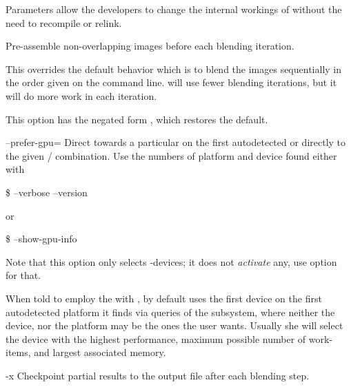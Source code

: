 \begin{codelist}
  Parameters allow the developers to change the internal workings of
  \App{} without the need to recompile or relink.


\ifenblend
  \label{opt:pre-assemble}%
  \item[\itempar{-a \\ --pre-assemble}]\itemend
    Pre-assemble non-overlapping images before each blending
    iteration.

    This overrides the default behavior which is to blend the images
    sequentially in the order given on the command line.  \App{} will
    use fewer blending iterations, but it will do more work in each
    iteration.

    This option has the negated form
    ,
    which restores the default.
\fi


  \label{opt:prefer-gpu}%
\item[--prefer-gpu=\optional{\metavar{PLATFORM}:}\metavar{DEVICE}
  \restrictednote{\acronym{OpenCL}-enabled versions only.}]\itemend
  Direct \App{} towards a particular 
   on the first autodetected
   or directly to the given
  \slash{} combination.  Use the
  numbers of platform and device found either with
  \begin{terminal}
    \$ \app{} --verbose --version
  \end{terminal}
  or
  \begin{terminal}
    \$ \app{} --show-gpu-info
  \end{terminal}
  Note that this option only selects -devices; it does
  not \emph{activate} any, use
  option~ for that.

  When told to employ the  with
  , by default \App{} uses the first device on the first
  autodetected platform it finds via queries of the
   subsystem, where neither the device,
  nor the platform may be the ones the user wants.  Usually she will
  select the device with the highest performance, maximum possible
  number of work-items, and largest associated memory.


\ifenblend
  \label{opt:x}%
  \item[-x] Checkpoint
     partial results to the output file
    after each blending step.
\fi



\end{codelist}
